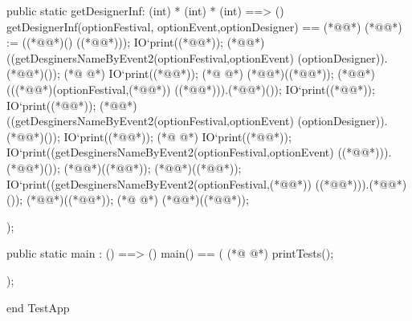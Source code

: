 \begin{vdmpp}[breaklines=true]
 public static getDesignerInf: (int) * (int) * (int) ==> ()
  getDesignerInf(optionFestival, optionEvent,optionDesigner) ==
  (*@\vdmnotcovered{(}@*) 
  (*@@*) := ((*@@*)() ((*@@*)));
  IO`print((*@@*));
   (*@@*)((getDesginersNameByEvent2(optionFestival,optionEvent) (optionDesigner)).(*@@*)());
(*@
\label{getEventByFestival:192}
@*)
   IO`print((*@@*));
(*@
\label{getModelsByEvent:193}
@*)
   (*@@*)((*@@*));
   (*@@*)(((*@@*)(optionFestival,(*@@*)) ((*@@*))).(*@@*)());
   IO`print((*@@*));
   IO`print((*@@*));
   (*@@*)((getDesginersNameByEvent2(optionFestival,optionEvent) (optionDesigner)).(*@@*)());
   IO`print((*@@*));
(*@
\label{getModelsNameByEvent:199}
@*)
   IO`print((*@@*));
   IO`print((getDesginersNameByEvent2(optionFestival,optionEvent) ((*@@*))).(*@@*)());
   (*@@*)((*@@*));
   (*@@*)((*@@*));
   IO`print((getDesginersNameByEvent2(optionFestival,(*@@*)) ((*@@*))).(*@@*)());
   (*@@*)((*@@*));
(*@
\label{getModelsNameByEvent2:205}
@*)
   (*@@*)((*@@*));
    
  );
  

public static main : () ==> ()
  main() ==
  (
(*@
\label{getModelInf:213}
@*)
   printTests();
  
  );

end TestApp
\end{vdmpp}
\bigskip

